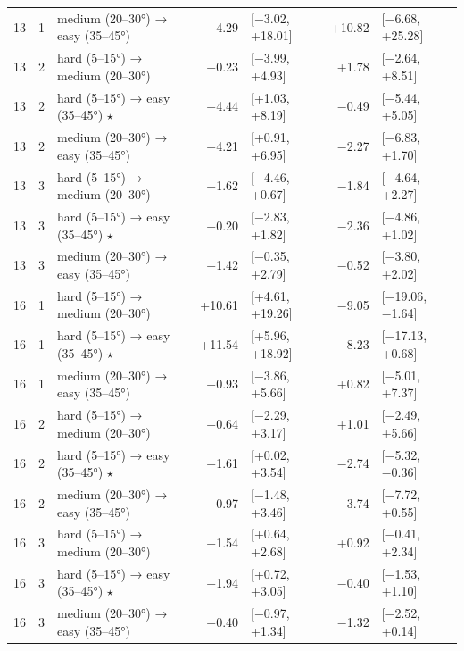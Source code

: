 \begin{table}[htbp]
\begin{tabular}{rllrlrl}
    13 & 1 & medium (20–30°) → easy (35–45°) & +4.29 & [−3.02, +18.01] & +10.82 & [−6.68, +25.28] \\
    13 & 2 & hard (5–15°) → medium (20–30°) & +0.23 & [−3.99, +4.93] & +1.78 & [−2.64, +8.51] \\
    13 & 2 & hard (5–15°) → easy (35–45°) $\star$ & +4.44 & [+1.03, +8.19] & −0.49 & [−5.44, +5.05] \\
    13 & 2 & medium (20–30°) → easy (35–45°) & +4.21 & [+0.91, +6.95] & −2.27 & [−6.83, +1.70] \\
    13 & 3 & hard (5–15°) → medium (20–30°) & −1.62 & [−4.46, +0.67] & −1.84 & [−4.64, +2.27] \\
    13 & 3 & hard (5–15°) → easy (35–45°) $\star$ & −0.20 & [−2.83, +1.82] & −2.36 & [−4.86, +1.02] \\
    13 & 3 & medium (20–30°) → easy (35–45°) & +1.42 & [−0.35, +2.79] & −0.52 & [−3.80, +2.02] \\
    16 & 1 & hard (5–15°) → medium (20–30°) & +10.61 & [+4.61, +19.26] & −9.05 & [−19.06, −1.64] \\
    16 & 1 & hard (5–15°) → easy (35–45°) $\star$ & +11.54 & [+5.96, +18.92] & −8.23 & [−17.13, +0.68] \\
    16 & 1 & medium (20–30°) → easy (35–45°) & +0.93 & [−3.86, +5.66] & +0.82 & [−5.01, +7.37] \\
    16 & 2 & hard (5–15°) → medium (20–30°) & +0.64 & [−2.29, +3.17] & +1.01 & [−2.49, +5.66] \\
    16 & 2 & hard (5–15°) → easy (35–45°) $\star$ & +1.61 & [+0.02, +3.54] & −2.74 & [−5.32, −0.36] \\
    16 & 2 & medium (20–30°) → easy (35–45°) & +0.97 & [−1.48, +3.46] & −3.74 & [−7.72, +0.55] \\
    16 & 3 & hard (5–15°) → medium (20–30°) & +1.54 & [+0.64, +2.68] & +0.92 & [−0.41, +2.34] \\
    16 & 3 & hard (5–15°) → easy (35–45°) $\star$ & +1.94 & [+0.72, +3.05] & −0.40 & [−1.53, +1.10] \\
    16 & 3 & medium (20–30°) → easy (35–45°) & +0.40 & [−0.97, +1.34] & −1.32 & [−2.52, +0.14] \\
    \bottomrule
  \end{tabular}
\end{table}
